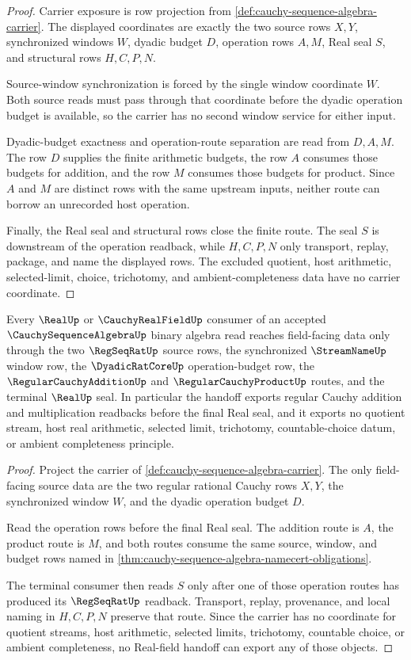\begin{proof}
Carrier exposure is row projection from \autoref{def:cauchy-sequence-algebra-carrier}. The displayed coordinates are exactly the two source rows $X,Y$, synchronized windows $W$, dyadic budget $D$, operation rows $A,M$, Real seal $S$, and structural rows $H,C,P,N$.

Source-window synchronization is forced by the single window coordinate $W$. Both source reads must pass through that coordinate before the dyadic operation budget is available, so the carrier has no second window service for either input.

Dyadic-budget exactness and operation-route separation are read from $D,A,M$. The row $D$ supplies the finite arithmetic budgets, the row $A$ consumes those budgets for addition, and the row $M$ consumes those budgets for product. Since $A$ and $M$ are distinct rows with the same upstream inputs, neither route can borrow an unrecorded host operation.

Finally, the Real seal and structural rows close the finite route. The seal $S$ is downstream of the operation readback, while $H,C,P,N$ only transport, replay, package, and name the displayed rows. The excluded quotient, host arithmetic, selected-limit, choice, trichotomy, and ambient-completeness data have no carrier coordinate.
\end{proof}

\begin{theorem}
\label{thm:cauchy-sequence-algebra-real-field-handoff}
Every $\RealUp$ or $\CauchyRealFieldUp$ consumer of an accepted $\CauchySequenceAlgebraUp$ binary algebra read reaches field-facing data only through the two $\RegSeqRatUp$ source rows, the synchronized $\StreamNameUp$ window row, the $\DyadicRatCoreUp$ operation-budget row, the $\RegularCauchyAdditionUp$ and $\RegularCauchyProductUp$ routes, and the terminal $\RealUp$ seal. In particular the handoff exports regular Cauchy addition and multiplication readbacks before the final Real seal, and it exports no quotient stream, host real arithmetic, selected limit, trichotomy, countable-choice datum, or ambient completeness principle.
\end{theorem}
\begin{proof}
Project the carrier of \autoref{def:cauchy-sequence-algebra-carrier}. The only field-facing source data are the two regular rational Cauchy rows $X,Y$, the synchronized window $W$, and the dyadic operation budget $D$.

Read the operation rows before the final Real seal. The addition route is $A$, the product route is $M$, and both routes consume the same source, window, and budget rows named in \autoref{thm:cauchy-sequence-algebra-namecert-obligations}.

The terminal consumer then reads $S$ only after one of those operation routes has produced its $\RegSeqRatUp$ readback. Transport, replay, provenance, and local naming in $H,C,P,N$ preserve that route. Since the carrier has no coordinate for quotient streams, host arithmetic, selected limits, trichotomy, countable choice, or ambient completeness, no Real-field handoff can export any of those objects.
\end{proof}


